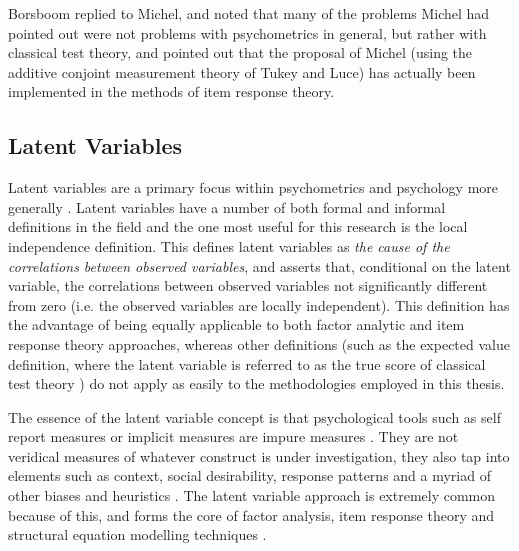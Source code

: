 Borsboom \cite{borsboom2004psychometrics} replied to Michel, and noted that many of the problems Michel had pointed out were not problems with psychometrics in general, but rather with classical test theory, and pointed out that the proposal of Michel (using the additive conjoint measurement theory of Tukey and Luce) has actually been implemented in the methods of item response theory. 

\subsection{Latent Variables}
\label{sec:latent-variables}

Latent variables are a primary focus within psychometrics and psychology more generally \cite{bollen2002latent} \cite{borsboom2006attack}. 
Latent variables have a number of both formal and informal definitions in the field \cite{bollen2002latent} and the one most useful for this research is the local independence definition. This defines latent variables as \textit{the cause of the correlations between observed variables}, and asserts that, conditional on the latent variable, the correlations between observed variables not significantly different from zero (i.e. the observed variables are locally independent). This definition has the advantage of being equally applicable to both factor analytic and item response theory approaches, whereas other definitions (such as the expected value definition, where the latent variable is referred to as the true score of classical test theory \cite{bollen2002latent}) do not apply as easily to the methodologies employed in this thesis. 

The essence of the latent variable concept is that psychological tools such as self report measures or implicit measures are impure measures \cite{edwards2000nature}. They are not veridical measures of whatever construct is under investigation, they also tap into elements such as context, social desirability, response patterns and a myriad of other biases and heuristics \cite{borsboom2006attack}. The latent variable approach is extremely common because of this, and forms the core of factor analysis, item response theory and structural equation modelling techniques \cite{bollen2002latent}. 


